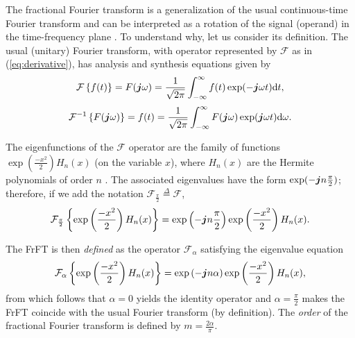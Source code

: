 The fractional Fourier transform is a generalization of the usual continuous-time Fourier transform and can be interpreted as a rotation of the signal (operand) in the time-frequency plane \cite{almeida1994fractional}. To understand why, let us consider its definition. The usual (unitary) Fourier transform, with operator represented by $\mathcal{F}$ as in (\ref{eq:derivative}), has analysis and synthesis equations given by
\begin{equation}
\mathcal{F}\left\{ f(t) \right\} = F(\boldsymbol{j} \omega) = \frac{1}{\sqrt{2 \pi}} \int_{-\infty}^{\infty} f(t) \exp(-\boldsymbol{j} \omega t) \mathrm{d}t,
\end{equation}
\begin{equation}
\mathcal{F}^{-1}\left\{ F(\boldsymbol{j} \omega) \right\} = f(t) = \frac{1}{\sqrt{2 \pi}} \int_{-\infty}^{\infty} F(\boldsymbol{j} \omega) \exp(\boldsymbol{j} \omega t) \mathrm{d}\omega.
\end{equation}

The eigenfunctions of the $\mathcal{F}$ operator are the family of functions $\exp (\frac{-x^2}{2}) H_n(x)$ (on the variable $x$), where $H_n(x)$ are the Hermite polynomials of order $n$ \cite{namias1980fractional}. The associated eigenvalues have the form $\exp(- \boldsymbol{j} n \frac{\pi}{2})$; therefore, if we add the notation $\mathcal{F}_{\frac{\pi}{2}} \overset{\Delta}{=} \mathcal{F}$,
\begin{equation}
\label{eq:eighermite}
\mathcal{F}_{\frac{\pi}{2}} \left\{ \exp \left(\frac{-x^2}{2}\right) H_n(x) \right\} = 
\exp\left(- \boldsymbol{j} n \frac{\pi}{2}\right)
\exp \left(\frac{-x^2}{2}\right) H_n(x).
\end{equation}

The FrFT is then \textit{defined} as the operator $\mathcal{F}_\alpha$ satisfying the eigenvalue equation
\begin{equation}
\label{eq:frftdef}
\mathcal{F}_{\alpha} \left\{ \exp \left(\frac{-x^2}{2}\right) H_n(x) \right\} = 
\exp\left(- \boldsymbol{j} n \alpha\right)
\exp \left(\frac{-x^2}{2}\right) H_n(x),
\end{equation}
from which follows that $\alpha = 0$ yields the identity operator and $\alpha = \frac{\pi}{2}$ makes the FrFT coincide with the usual Fourier transform (by definition). The \textit{order} of the fractional Fourier transform is defined by $m = \frac{2\alpha}{\pi}$.

